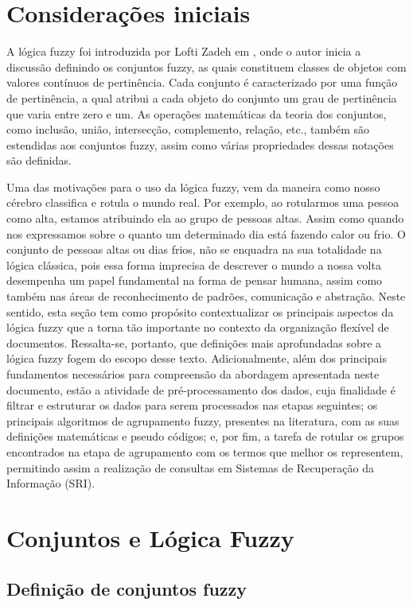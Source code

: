 \section{Considerações iniciais}
A lógica fuzzy foi introduzida por Lofti Zadeh em \cite{Zadeh1965}, onde o autor inicia a discussão
definindo os conjuntos fuzzy, as quais constituem classes de objetos com valores contínuos de
pertinência. Cada conjunto é caracterizado por uma função de pertinência, a qual atribui a cada
objeto do conjunto um grau de pertinência que varia entre zero e um. As operações matemáticas da
teoria dos conjuntos, como inclusão, união, intersecção, complemento, relação, etc., também são
estendidas aos conjuntos fuzzy, assim como várias propriedades dessas notações são definidas.

Uma das motivações para o uso da lógica fuzzy, vem da maneira como nosso cérebro classifica e rotula
o mundo real. Por exemplo, ao rotularmos uma pessoa como alta, estamos atribuindo ela ao grupo de
pessoas altas. Assim como quando nos expressamos sobre o quanto um determinado dia está fazendo
calor ou frio. O conjunto de pessoas altas ou dias frios, não se enquadra na sua totalidade na
lógica clássica, pois essa forma imprecisa de descrever o mundo a nossa volta desempenha um papel
fundamental na forma de pensar humana, assim como também nas áreas de reconhecimento de padrões,
comunicação e abstração\cite{Zadeh1965}.  Neste sentido, esta seção tem como propósito
contextualizar os principais aspectos da lógica fuzzy que a torna tão importante no contexto da
organização flexível de documentos. Ressalta-se, portanto, que definições mais aprofundadas sobre a
lógica fuzzy fogem do escopo desse texto.  Adicionalmente, além dos principais fundamentos
necessários para compreensão da abordagem apresentada neste documento, estão a atividade de
pré-processamento dos dados, cuja finalidade é filtrar e estruturar os dados para serem processados
nas etapas seguintes; os principais algoritmos de agrupamento fuzzy, presentes na literatura, com as
suas definições matemáticas e pseudo códigos; e, por fim, a tarefa de rotular os grupos
encontrados na etapa de agrupamento com os termos que melhor os representem, permitindo assim a
realização de consultas em Sistemas de Recuperação da Informação
(SRI).

\section{Conjuntos e Lógica Fuzzy}

\subsection{Definição de conjuntos fuzzy}

